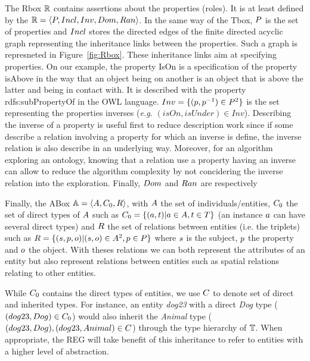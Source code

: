 The Rbox $\mathbb{R}$ contains assertions about the properties (roles). It is at least defined by the $\mathbb{R} = \langle P, Incl, Inv, Dom, Ran \rangle$. In the same way of the Tbox, $P$ is the set of properties and $Incl$ stores the directed edges of the finite directed acyclic graph representing the inheritance links between the properties. Such a graph is represneted in Figure~\ref{fig:Rbox}. These inheritance links aim at specifying properties. On our example, the property IsOn is a specification of the property isAbove in the way that an object being on another is an object that is above the latter and being in contact with. It is described with the property rdfs:subPropertyOf in the OWL language. 
$Inv = \{(p, p^{-1}) \in P^2\}$ is the set representing the properties inverses (\textit{e.g.} $(isOn, isUnder) \in Inv$). Describing the inverse of a property is useful first to reduce description work since if some describe a relation involving a property for which an inverse is define, the inverse relation is also describe in an underlying way. Moreover, for an algorithm exploring an ontology, knowing that a relation use a property having an inverse can allow to reduce the algorithm complexity by not concidering the inverse relation into the exploration.
Finally, $Dom$ and $Ran$ are respectively 


Finally, the ABox $\mathbb{A} = \langle A, C_0, R \rangle$, with $A$ the set of individuals/entities, $C_0$ the set of direct types of $A$ such as $C_0 = \{(a, t) | a \in A, t \in T \}$ (an instance $a$ can have several direct types) and $R$ the set of relations between entities (i.e. the triplets) such as $R = \{(s, p ,o) | (s, o) \in A^2, p \in P\}$ where $s$ is the subject, $p$ the property and $o$ the object. With theses relations we can both represent the attributes of an entity but also represent relations between entities such as spatial relations relating to other entities.


While $C_0$ contains the direct types of entities, we use $C$ to denote set of direct and inherited types.
For instance, an entity \textit{dog23} with a direct \textit{Dog} type ($(dog23, Dog) \in C_0$) would also inherit the \textit{Animal} type ($(dog23, Dog), (dog23, Animal) \in C$) through the type hierarchy of $\mathbb{T}$. When appropriate, the REG will take benefit of this  inheritance to refer to entities with a higher level of abstraction.

